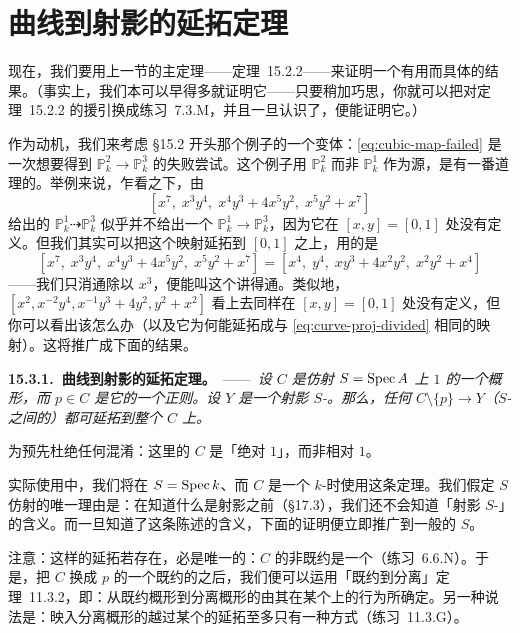 
\section{曲线到射影的延拓定理}

现在，我们要用上一节的主定理——\mbox{定理~15.2.2}——来证明一个有用而具体的结果。（事实上，我们本可以早得多就证明它——只要稍加巧思，你就可以把对\mbox{定理~15.2.2} 的援引换成\mbox{练习~7.3.M}，并且一旦认识了\trDVR，便能证明它。）

作为动机，我们来考虑 \S15.2 开头那个例子的一个变体：\eqref{eq:cubic-map-failed} 是一次想要得到\trMorphism{} $\mathbb{P}^2_k\to\mathbb{P}^3_k$ 的失败尝试。这个例子用 $\mathbb{P}^2_k$ 而非 $\mathbb{P}^1_k$ 作为源，是有一番道理的。举例来说，乍看之下，由
\[
[x^7,\; x^3y^4,\; x^4y^3+4x^5y^2,\; x^5y^2+x^7]
\]
给出的\trRationalMap{} $\mathbb{P}^1_k\dashrightarrow\mathbb{P}^3_k$ 似乎并不给出一个\trMorphism{} $\mathbb{P}^1_k\to\mathbb{P}^3_k$，因为它在 $[x,y]=[0,1]$ 处没有定义。但我们其实可以把这个映射延拓到 $[0,1]$ 之上，用的是
\begin{equation*}\tag{15.3.0.1}\label{eq:curve-proj-divided}
[x^7,\; x^3y^4,\; x^4y^3+4x^5y^2,\; x^5y^2+x^7]=[x^4,\; y^4,\; xy^3+4x^2y^2,\; x^2y^2+x^4]
\end{equation*}
——我们只消通除以 $x^3$，便能叫这个\trMorphism{}讲得通。类似地，$[x^2,x^{-2}y^4,x^{-1}y^3+4y^2,y^2+x^2]$ 看上去同样在 $[x,y]=[0,1]$ 处没有定义，但你可以看出该怎么办（以及它为何能延拓成与 \eqref{eq:curve-proj-divided} 相同的映射）。这将推广成下面的结果。

\textbf{15.3.1.\ 曲线到射影的延拓定理。}\ ——\ \emph{设 $C$ 是仿射\trBaseScheme{} $S=\operatorname{Spec} A$ 上\trPureDimension{} $1$ 的一个\trNoetherian{}概形，而 $p\in C$ 是它的一个正则\trClosedPoint。设 $Y$ 是一个射影 $S$-\trScheme。那么，任何\trMorphism{} $C\setminus\{p\}\to Y$（$S$-\trScheme{}之间的\trMorphism）都可延拓到整个 $C$ 上。}

为预先杜绝任何混淆：这里的 $C$ 是「绝对\trPureDimension{} $1$」，而非相对\trPureDimension{} $1$。

实际使用中，我们将在 $S=\operatorname{Spec} k$、而 $C$ 是一个 $k$-\trVariety{}时使用这条定理。我们假定 $S$ 仿射的唯一理由是：在知道什么是射影\trMorphism{}之前（\S17.3），我们还不会知道「射影 $S$-\trScheme」的含义。而一旦知道了这条陈述的含义，下面的证明便立即推广到一般的 $S$。

注意：这样的延拓若存在，必是唯一的：$C$ 的非既约\trLocus{}是一个\trClosedSubset（练习~6.6.N）。于是，把 $C$ 换成 $p$ 的一个既约的\trOpen\trNeighborhood{}之后，我们便可以运用「既约到分离」定理~11.3.2，即：从既约概形到分离概形的\trMorphism{}由其在某个\trDense\trOpenSubset{}上的行为所确定。另一种说法是：映入分离概形的\trMorphism{}越过某个\trEffectiveCartierDivisor{}的延拓至多只有一种方式（\mbox{练习~11.3.G}）。

